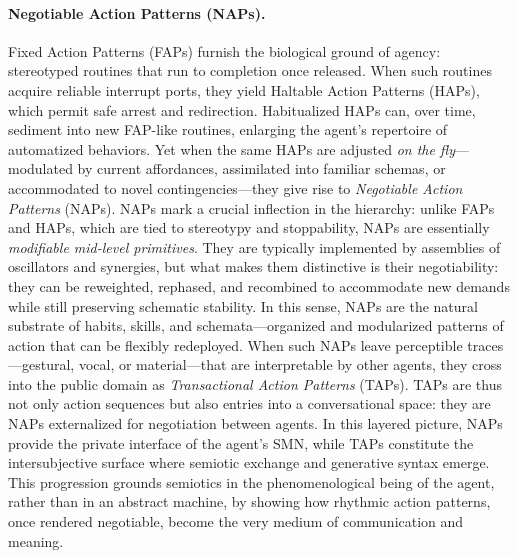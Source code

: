 \paragraph{Negotiable Action Patterns (NAPs).} Fixed Action Patterns (FAPs) furnish the biological ground of agency: stereotyped routines that run to completion once released.  When such routines acquire reliable interrupt ports, they yield Haltable Action Patterns (HAPs), which permit safe arrest and redirection.  Habitualized HAPs can, over time, sediment into new FAP-like routines, enlarging the agent’s repertoire of automatized behaviors.  Yet when the same HAPs are adjusted \emph{on the fly}—modulated by current affordances, assimilated into familiar schemas, or accommodated to novel contingencies—they give rise to \emph{Negotiable Action Patterns} (NAPs).  NAPs mark a crucial inflection in the hierarchy: unlike FAPs and HAPs, which are tied to stereotypy and stoppability, NAPs are essentially \emph{modifiable mid-level primitives}.  They are typically implemented by assemblies of oscillators and synergies, but what makes them distinctive is their negotiability: they can be reweighted, rephased, and recombined to accommodate new demands while still preserving schematic stability.  In this sense, NAPs are the natural substrate of habits, skills, and schemata—organized and modularized patterns of action that can be flexibly redeployed.   When such NAPs leave perceptible traces—gestural, vocal, or material—that are interpretable by other agents, they cross into the public domain as \emph{Transactional Action Patterns} (TAPs).  TAPs are thus not only action sequences but also entries into a conversational space: they are NAPs externalized for negotiation between agents.  In this layered picture, NAPs provide the private interface of the agent’s SMN, while TAPs constitute the intersubjective surface where semiotic exchange and generative syntax emerge.  This progression grounds semiotics in the phenomenological being of the agent, rather than in an abstract machine, by showing how rhythmic action patterns, once rendered negotiable, become the very medium of communication and meaning.

